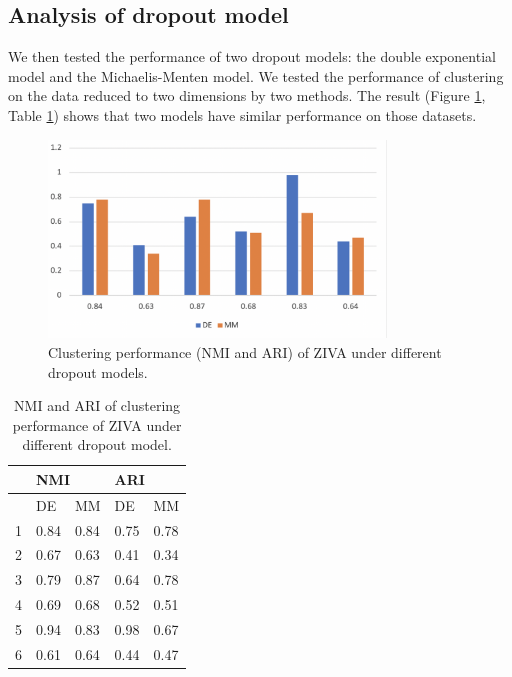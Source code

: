 \subsection{Analysis of dropout model}
We then tested the performance of two dropout models: the double exponential model and the Michaelis-Menten model. We tested the performance of clustering on the data reduced to two dimensions by two methods. The result (Figure \ref{nbmmari}, Table \ref{tnbmm}) shows that two models have similar performance on those datasets.
\begin{figure}[htb!]
    \centering
    \includegraphics[width=0.8\textwidth]{figures/myfigures/nbmmari.png}
    \caption{Clustering performance (NMI and ARI) of ZIVA under different dropout models.}
    \label{nbmmari}
\end{figure}

\begin{table}[htb!]
\centering
\caption{NMI and ARI of clustering performance of ZIVA under different dropout model.}
\label{tnbmm}
\begin{tabular}{lllll}
\hline
  & \multicolumn{2}{l}{NMI} & \multicolumn{2}{l}{ARI} \\ \hline
  & DE         & MM         & DE         & MM         \\ \hline
1 & 0.84       & 0.84       & 0.75       & 0.78       \\
2 & 0.67       & 0.63       & 0.41       & 0.34       \\
3 & 0.79       & 0.87       & 0.64       & 0.78       \\
4 & 0.69       & 0.68       & 0.52       & 0.51       \\
5 & 0.94       & 0.83       & 0.98       & 0.67       \\
6 & 0.61       & 0.64       & 0.44       & 0.47       \\ \hline
\end{tabular}
\end{table}

